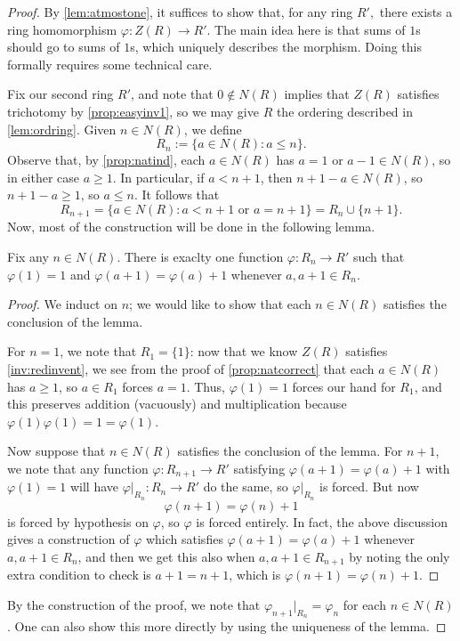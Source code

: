 \documentclass{article}
\begin{document}
\begin{proof}
	By \autoref{lem:atmostone}, it suffices to show that, for any ring $R',$ there exists a ring homomorphism $\varphi:Z(R)\to R'$. The main idea here is that sums of $1$s should go to sums of $1$s, which uniquely describes the morphism. Doing this formally requires some technical care.
	
	Fix our second ring $R'$, and note that $0\notin N(R)$ implies that $Z(R)$ satisfies trichotomy by \autoref{prop:easyinv1}, so we may give $R$ the ordering described in \autoref{lem:ordring}. Given $n\in N(R)$, we define
	\[R_n:=\{a\in N(R):a\le n\}.\]
	Observe that, by \autoref{prop:natind}, each $a\in N(R)$ has $a=1$ or $a-1\in N(R)$, so in either case $a\ge1$. In particular, if $a<n+1$, then $n+1-a\in N(R)$, so $n+1-a\ge1$, so $a\le n$. It follows that
	\[R_{n+1}=\{a\in N(R):a<n+1\text{ or }a=n+1\}=R_n\cup\{n+1\}.\]
	Now, most of the construction will be done in the following lemma.
	\begin{lemma}
		Fix any $n\in N(R)$. There is exaclty one function $\varphi:R_n\to R'$ such that $\varphi(1)=1$ and $\varphi(a+1)=\varphi(a)+1$ whenever $a,a+1\in R_n$.
	\end{lemma}
	\begin{proof}
		We induct on $n$; we would like to show that each $n\in N(R)$ satisfies the conclusion of the lemma.
		
		For $n=1$, we note that $R_1=\{1\}$: now that we know $Z(R)$ satisfies \autoref{inv:redinvent}, we see from the proof of \autoref{prop:natcorrect} that each $a\in N(R)$ has $a\ge1$, so $a\in R_1$ forces $a=1$. Thus, $\varphi(1)=1$ forces our hand for $R_1$, and this preserves addition (vacuously) and multiplication because $\varphi(1)\varphi(1)=1=\varphi(1)$.

		Now suppose that $n\in N(R)$ satisfies the conclusion of the lemma. For $n+1$, we note that any function $\varphi:R_{n+1}\to R'$ satisfying $\varphi(a+1)=\varphi(a)+1$ with $\varphi(1)=1$ will have $\varphi|_{R_n}:R_n\to R'$ do the same, so $\varphi|_{R_n}$ is forced. But now
		\[\varphi(n+1)=\varphi(n)+1\]
		is forced by hypothesis on $\varphi$, so $\varphi$ is forced entirely. In fact, the above discussion gives a construction of $\varphi$ which satisfies $\varphi(a+1)=\varphi(a)+1$ whenever $a,a+1\in R_n$, and then we get this also when $a,a+1\in R_{n+1}$ by noting the only extra condition to check is $a+1=n+1$, which is $\varphi(n+1)=\varphi(n)+1$.
	\end{proof}
	By the construction of the proof, we note that $\varphi_{n+1}|_{R_n}=\varphi_n$ for each $n\in N(R)$. One can also show this more directly by using the uniqueness of the lemma.


\end{proof}
\end{document}
